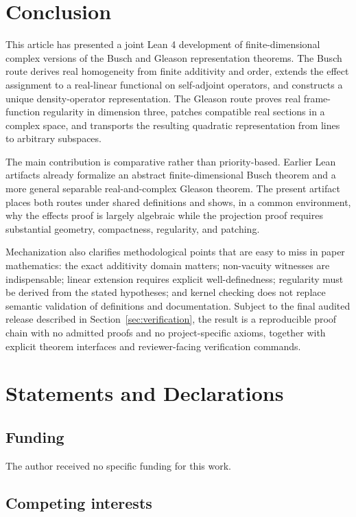 \documentclass[pdflatex,sn-mathphys-num]{sn-jnl}
\theoremstyle{thmstyleone}
\theoremstyle{thmstylethree}
\begin{document}
\section{Conclusion}\label{sec:conclusion}

This article has presented a joint Lean 4 development of finite-dimensional complex versions of the Busch and Gleason representation theorems. The Busch route derives real homogeneity from finite additivity and order, extends the effect assignment to a real-linear functional on self-adjoint operators, and constructs a unique density-operator representation. The Gleason route proves real frame-function regularity in dimension three, patches compatible real sections in a complex space, and transports the resulting quadratic representation from lines to arbitrary subspaces.

The main contribution is comparative rather than priority-based. Earlier Lean artifacts already formalize an abstract finite-dimensional Busch theorem and a more general separable real-and-complex Gleason theorem. The present artifact places both routes under shared definitions and shows, in a common environment, why the effects proof is largely algebraic while the projection proof requires substantial geometry, compactness, regularity, and patching.

Mechanization also clarifies methodological points that are easy to miss in paper mathematics: the exact additivity domain matters; non-vacuity witnesses are indispensable; linear extension requires explicit well-definedness; regularity must be derived from the stated hypotheses; and kernel checking does not replace semantic validation of definitions and documentation. Subject to the final audited release described in Section~\ref{sec:verification}, the result is a reproducible proof chain with no admitted proofs and no project-specific axioms, together with explicit theorem interfaces and reviewer-facing verification commands.

\section*{Statements and Declarations}

\subsection*{Funding}

The author received no specific funding for this work.

\subsection*{Competing interests}
\end{document}
